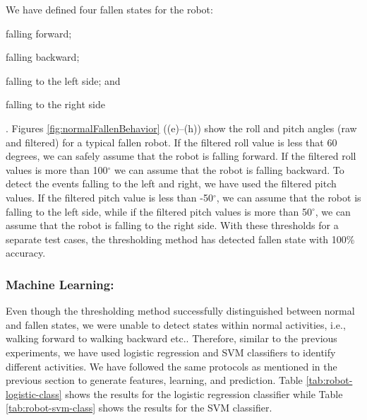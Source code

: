 \documentclass[letterpaper]{article}
\begin{document}
\begin{sloppy}
We have defined four fallen states for the robot: \begin{inparaenum}[(1)] \item falling
forward; \item falling backward; \item falling to the left side; and \item falling to the right
side\end{inparaenum}. Figures \ref{fig:normalFallenBehavior} ((e)--(h)) show the roll and pitch 
angles (raw and filtered) for a typical fallen robot. If the filtered roll value is less that 60 
degrees, we can safely assume that the robot is falling forward. If the filtered roll values is 
more than 100$^{\circ}$ we can assume that the robot is falling backward. To detect the events 
falling to the left and right, we have used the filtered pitch values. If the filtered pitch value 
is less than -50$^{\circ}$, we can assume that the robot is falling to the left side, while if the 
filtered pitch values is more than 50$^{\circ}$, we can assume that the robot is falling to the right 
side. With these thresholds for a separate test cases, the thresholding method has detected fallen 
state with 100\% accuracy. 

\subsubsection{Machine Learning:}
Even though the thresholding method successfully distinguished between normal and fallen states, we were 
unable to detect states within normal activities, i.e., walking forward to walking backward etc.. 
Therefore, similar to the previous experiments, we have used logistic regression and SVM 
classifiers to identify different activities. We have followed the same protocols as mentioned in 
the previous section to generate features, learning, and prediction. Table 
\ref{tab:robot-logistic-class} shows the results for the logistic regression classifier while 
Table \ref{tab:robot-svm-class} shows the results for the SVM classifier.    



\end{sloppy}
\end{document}
